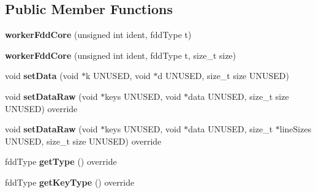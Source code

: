 \subsection*{Public Member Functions}
\begin{DoxyCompactItemize}
\item 
\hypertarget{classfaster_1_1workerFddCore_a83405d10b12b6a2c52e05ce6aa154a58}{}{\bfseries worker\+Fdd\+Core} (unsigned int ident, fdd\+Type t)\label{classfaster_1_1workerFddCore_a83405d10b12b6a2c52e05ce6aa154a58}

\item 
\hypertarget{classfaster_1_1workerFddCore_a916e1e6320f5d65f876ea8a13b8e4962}{}{\bfseries worker\+Fdd\+Core} (unsigned int ident, fdd\+Type t, size\+\_\+t size)\label{classfaster_1_1workerFddCore_a916e1e6320f5d65f876ea8a13b8e4962}

\item 
\hypertarget{classfaster_1_1workerFddCore_aadc1b6c29965af371b2c6b3f246108f6}{}void {\bfseries set\+Data} (void $\ast$k U\+N\+U\+S\+E\+D, void $\ast$d U\+N\+U\+S\+E\+D, size\+\_\+t size U\+N\+U\+S\+E\+D)\label{classfaster_1_1workerFddCore_aadc1b6c29965af371b2c6b3f246108f6}

\item 
\hypertarget{classfaster_1_1workerFddCore_ad18325128eb5c84bf1ce2c14dd885ec8}{}void {\bfseries set\+Data\+Raw} (void $\ast$keys U\+N\+U\+S\+E\+D, void $\ast$data U\+N\+U\+S\+E\+D, size\+\_\+t size U\+N\+U\+S\+E\+D) override\label{classfaster_1_1workerFddCore_ad18325128eb5c84bf1ce2c14dd885ec8}

\item 
\hypertarget{classfaster_1_1workerFddCore_ac41afe052888d211137a09702ab19ac8}{}void {\bfseries set\+Data\+Raw} (void $\ast$keys U\+N\+U\+S\+E\+D, void $\ast$data U\+N\+U\+S\+E\+D, size\+\_\+t $\ast$line\+Sizes U\+N\+U\+S\+E\+D, size\+\_\+t size U\+N\+U\+S\+E\+D) override\label{classfaster_1_1workerFddCore_ac41afe052888d211137a09702ab19ac8}

\item 
\hypertarget{classfaster_1_1workerFddCore_a76c12aa66cb7baebdb63688f7599dd41}{}fdd\+Type {\bfseries get\+Type} () override\label{classfaster_1_1workerFddCore_a76c12aa66cb7baebdb63688f7599dd41}

\item 
\hypertarget{classfaster_1_1workerFddCore_a2782ab77ddb4a72cf4f84af84072efba}{}fdd\+Type {\bfseries get\+Key\+Type} () override\label{classfaster_1_1workerFddCore_a2782ab77ddb4a72cf4f84af84072efba}


\end{DoxyCompactItemize}
